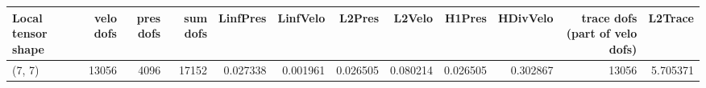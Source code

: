 \begin{tabular}{lrrrrrrrrrrr}
\toprule
Local tensor shape &  velo dofs &  pres dofs &  sum dofs &  LinfPres &  LinfVelo &   L2Pres &   L2Velo &   H1Pres &  HDivVelo &  trace dofs (part of velo dofs) &  L2Trace \\
\midrule
            (7, 7) &      13056 &       4096 &     17152 &  0.027338 &  0.001961 & 0.026505 & 0.080214 & 0.026505 &  0.302867 &                           13056 & 5.705371 \\
\bottomrule
\end{tabular}
